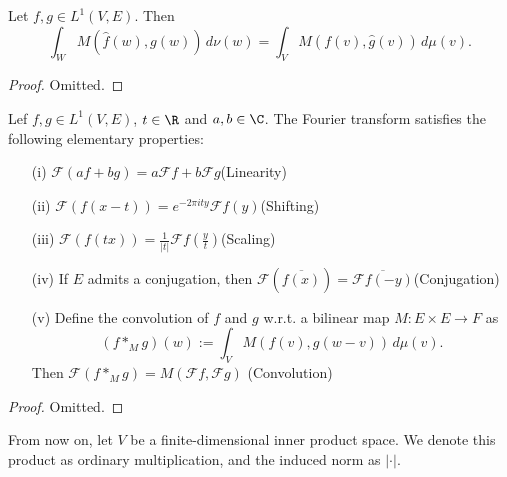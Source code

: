\begin{lemma}
\label{lem:fourier-multiplication}
\leanok
Let $f,g\in L^1(V,E)$. Then
$$\int_WM(\widehat f(w),g(w))\,d\nu(w)=\int_VM(f(v),\widehat g(v))\,d\mu(v).$$
\end{lemma}
\begin{proof}
  \leanok
  Omitted.
\end{proof}

\begin{lemma}
  \label{lem:fourier-prop}
  \lean{}
Lef $f,g\in L^1(V,E)$, $t\in\R$ and $a,b\in\C$. The Fourier transform satisfies the following elementary properties:
\begin{enumerate}
  \item[(i)] $\mathcal F(af+bg)=a\mathcal Ff+b\mathcal Fg$\hfill(Linearity)
  \item[(ii)] $\mathcal F(f(x-t)) = e^{-2\pi i ty}\mathcal F f(y)$\hfill (Shifting)
  \item[(iii)] $\mathcal F(f(tx)) = \frac1{|t|}\mathcal F f(\frac yt)$\hfill (Scaling)
  \item[(iv)] If $E$ admits a conjugation, then $\mathcal F(\overline{f(x)}) = \overline{\mathcal Ff(-y)}$\hfill (Conjugation)
  \item[(v)] Define the convolution of $f$ and $g$ w.r.t. a bilinear map $M:E\times E\to F$ as
             $$(f\ast_Mg)(w):=\int_VM(f(v),g(w-v))\,d\mu(v).$$ Then
             $\mathcal F(f\ast_M g) =M(\mathcal Ff,\mathcal Fg)$ \hfill (Convolution)
\end{enumerate}
\end{lemma}
\begin{proof}
  Omitted.
\end{proof}
From now on, let $V$ be a finite-dimensional inner product space.
We denote this product as ordinary multiplication, and the induced norm as $|\cdot|.$

